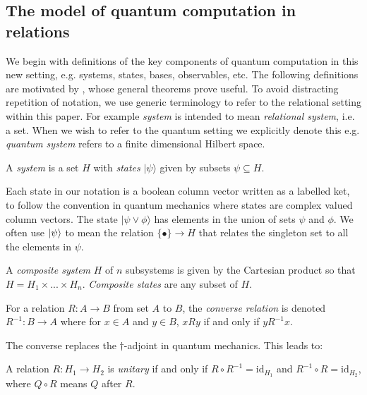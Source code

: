 \subsection{The model of quantum computation in relations}

We begin with definitions of the key components of quantum computation in this new setting, e.g. systems, states, bases, observables, etc.  The following definitions are motivated by , whose general theorems prove useful. To avoid distracting repetition of notation, we use generic terminology to refer to the relational setting within this paper.  For example \emph{system} is intended to mean \emph{relational system}, i.e. a set.  When we wish to refer to the quantum setting we explicitly denote this e.g. \emph{quantum system} refers to a finite dimensional Hilbert space.

\begin{axiom}
A \emph{system} is a set $H$ with \emph{states} $|\psi\rangle$ given by subsets $\psi\subseteq H$.
\end{axiom}


\noindent Each state in our notation is a boolean column vector written as a labelled ket, to follow the convention in quantum mechanics where states are complex valued column vectors. The state $|\psi\vee\phi\rangle$ has elements in the union of sets $\psi$ and $\phi$. We often use $| \psi \rangle$ to mean the relation $\{\bullet\}\to H$ that relates the singleton set to all the elements in $\psi$.

\begin{axiom}
A \emph{composite system} $H$ of $n$ subsystems is given by the Cartesian product so that $H = H_1\times...\times H_n$. \emph{Composite states} are any subset of $H$.
\end{axiom}

\begin{defn}
For a relation $R:A\to B$ from set $A$ to $B$, the \emph{converse relation} is denoted $R^{-1}:B\to A$ where for $x\in A$ and $y\in B$, $xRy$ if and only if $yR^{-1}x$.
\end{defn}

\noindent The converse replaces the $\dagger$-adjoint in quantum mechanics. This leads to:

\begin{defn}
A relation $R:H_1\to H_2$ is \emph{unitary} if and only if $R\circ R^{-1} = \mbox{id}_{H_1}$ and $R^{-1}\circ R = \mbox{id}_{H_2}$, where $Q\circ R$ means $Q$ after $R$.
\end{defn}

